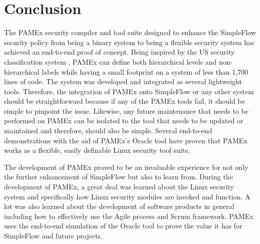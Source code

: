 \section{Conclusion}
\label{sec:Conclusion}
\par 
\vspace{\baselineskip}
\hspace{1em}
The PAMEx security compiler and tool suite designed to enhance the 
SimpleFlow security policy from being a binary system to being a 
flexible security system has achieved an end-to-end proof of concept. 
Being inspired by the US security classification system \cite{natsecinfo}, PAMEx can 
define both hierarchical levels and non-hierarchical labels while 
having a small footprint on a system of less than 1,700 lines 
of code. The system was developed and integrated as several lightweight 
tools. Therefore, the integration of PAMEx onto SimpleFlow or any 
other system should be straightforward because if any of the PAMEx 
tools fail, it should be simple to pinpoint the issue. 
Likewise, any future maintenance that needs to be performed on PAMEx 
can be isolated to the tool that needs to be updated or maintained and 
therefore, should also be simple. Several end-to-end demonstrations
with the aid of PAMEx's Oracle tool have proven that PAMEx works as a 
flexible, easily definable Linux security tool suite.

The development of PAMEx proved to be an invaluable experience for not 
only the further enhancement of SimpleFlow but also to 
learn from. During the development of PAMEx, a great deal was learned about the Linux security system and specifically how Linux security 
modules are invoked and function. A lot was also learned about the development of software products in general including how 
to effectively use the Agile process and Scrum framework. PAMEx uses the end-to-end simulation of the Oracle tool to prove the 
value it has for SimpleFlow and future projects. 